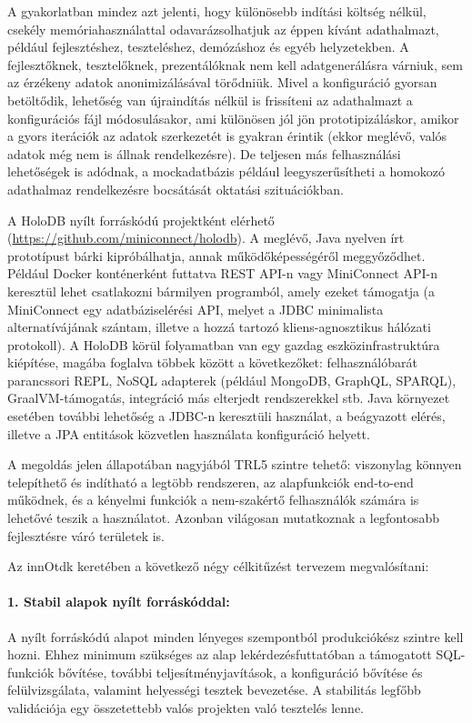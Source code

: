 \documentclass[12pt]{article}
\begin{document}
A gyakorlatban mindez azt jelenti, hogy különösebb indítási költség nélkül, csekély memóriahasználattal odavarázsolhatjuk az éppen kívánt adathalmazt, például fejlesztéshez, teszteléshez, demózáshoz és egyéb helyzetekben.
A fejlesztőknek, tesztelőknek, prezentálóknak nem kell adatgenerálásra várniuk, sem az érzékeny adatok anonimizálásával törődniük.
Mivel a konfiguráció gyorsan betöltődik, lehetőség van újraindítás nélkül is frissíteni az adathalmazt a konfigurációs fájl módosulásakor, ami különösen jól jön prototipizáláskor, amikor a gyors iterációk az adatok szerkezetét is gyakran érintik (ekkor meglévő, valós adatok még nem is állnak rendelkezésre).
De teljesen más felhasználási lehetőségek is adódnak, a mockadatbázis például leegyszerűsítheti a homokozó adathalmaz rendelkezésre bocsátását oktatási szituációkban.

A HoloDB nyílt forráskódú projektként elérhető ({\small \url{https://github.com/miniconnect/holodb}}).
A meglévő, Java nyelven írt prototípust bárki kipróbálhatja, annak működőképességéről meggyőződhet.
Például Docker konténerként futtatva REST API-n vagy MiniConnect API-n keresztül lehet csatlakozni bármilyen programból, amely ezeket támogatja
(a MiniConnect egy adatbáziselérési API, melyet a JDBC minimalista alternatívájának szántam, illetve a hozzá tartozó kliens-agnosztikus hálózati protokoll).
A HoloDB körül folyamatban van egy gazdag eszközinfrastruktúra kiépítése, magába foglalva többek között a következőket: felhasználóbarát parancssori REPL, NoSQL adapterek (például MongoDB, GraphQL, SPARQL), GraalVM-támogatás, integráció más elterjedt rendszerekkel stb.
Java környezet esetében további lehetőség a JDBC-n keresztüli használat,
a beágyazott elérés, illetve a JPA entitások közvetlen használata konfiguráció helyett.

A megoldás jelen állapotában nagyjából TRL5 szintre tehető:
viszonylag könnyen telepíthető és indítható a legtöbb rendszeren,
az alapfunkciók end-to-end működnek,
és a kényelmi funkciók a nem-szakértő felhasználók számára is lehetővé teszik a használatot.
Azonban világosan mutatkoznak a legfontosabb fejlesztésre váró területek is.

Az innOtdk keretében a következő négy célkitűzést tervezem megvalósítani:

\paragraph{1. Stabil alapok nyílt forráskóddal:}
A nyílt forráskódú alapot minden lényeges szempontból produkciókész szintre kell hozni.
Ehhez minimum szükséges az alap lekérdezésfuttatóban a támogatott SQL-funkciók bővítése,
további teljesítményjavítások,
a konfiguráció bővítése és felülvizsgálata,
valamint helyességi tesztek bevezetése.
A stabilitás legfőbb validációja egy összetettebb valós projekten való tesztelés lenne.
\end{document}
